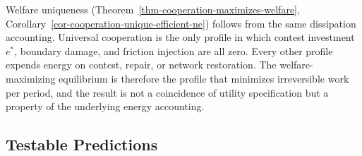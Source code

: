 \documentclass[11pt]{article}
\theoremstyle{plain}
\theoremstyle{definition}
\theoremstyle{remark}
\let\origsubsection\subsection
\renewcommand{\subsection}{\needspace{7\baselineskip}\origsubsection}
\begin{document}
Welfare uniqueness (Theorem~\ref{thm-cooperation-maximizes-welfare},
Corollary~\ref{cor-cooperation-unique-efficient-ne}) follows from the
same dissipation accounting. Universal cooperation is the only profile
in which contest investment \(e^*\), boundary damage, and friction
injection are all zero. Every other profile expends energy on contest,
repair, or network restoration. The welfare-maximizing equilibrium is
therefore the profile that minimizes irreversible work per period, and
the result is not a coincidence of utility specification but a property
of the underlying energy accounting.

\subsection{Testable Predictions}\label{testable-predictions}
\end{document}
